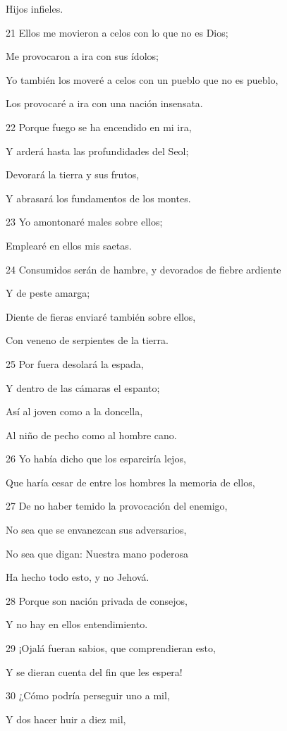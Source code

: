 \par Hijos infieles.
\par 21 Ellos me movieron a celos con lo que no es Dios;
\par Me provocaron a ira con sus ídolos;
\par Yo también los moveré a celos con un pueblo que no es pueblo,
\par Los provocaré a ira con una nación insensata. 
\par 22 Porque fuego se ha encendido en mi ira,
\par Y arderá hasta las profundidades del Seol;
\par Devorará la tierra y sus frutos,
\par Y abrasará los fundamentos de los montes.
\par 23 Yo amontonaré males sobre ellos;
\par Emplearé en ellos mis saetas.
\par 24 Consumidos serán de hambre, y devorados de fiebre ardiente
\par Y de peste amarga;
\par Diente de fieras enviaré también sobre ellos,
\par Con veneno de serpientes de la tierra.
\par 25 Por fuera desolará la espada,
\par Y dentro de las cámaras el espanto;
\par Así al joven como a la doncella,
\par Al niño de pecho como al hombre cano.
\par 26 Yo había dicho que los esparciría lejos,
\par Que haría cesar de entre los hombres la memoria de ellos,
\par 27 De no haber temido la provocación del enemigo,
\par No sea que se envanezcan sus adversarios,
\par No sea que digan: Nuestra mano poderosa
\par Ha hecho todo esto, y no Jehová.
\par 28 Porque son nación privada de consejos,
\par Y no hay en ellos entendimiento.
\par 29 ¡Ojalá fueran sabios, que comprendieran esto,
\par Y se dieran cuenta del fin que les espera!
\par 30 ¿Cómo podría perseguir uno a mil,
\par Y dos hacer huir a diez mil,
